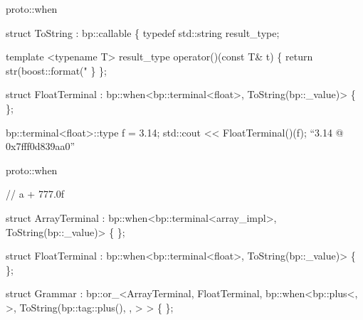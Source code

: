 
\begin{frame}[fragile]{proto::when}
\begin{semiverbatim}
struct ToString : bp::callable
\{
  typedef std::string result_type;
  
  template <typename T>
  result_type operator()(const T& t)
  \{
    return str(boost::format("%
  \}
\};

struct FloatTerminal
  : bp::when<bp::terminal<float>, ToString(bp::_value)>
\{ \};

bp::terminal<float>::type f = {3.14}; 
std::cout << FloatTerminal()(f);  
``3.14 @ 0x7fff0d839aa0''

\end{semiverbatim}
\note{ }
\end{frame}


\begin{frame}[fragile]{proto::when}
\begin{semiverbatim}
// \alert<1>{a + 777.0f}

struct \alert<3>{ArrayTerminal}
  : bp::when<\alert<2,8>{bp::terminal<\alert<9>{array_impl}>}, \alert<11>{ToString(bp::_value)}>
\{ \};

struct \alert<5>{FloatTerminal}
  : bp::when<\alert<4>{bp::terminal<float>}, ToString(bp::_value)>
\{ \};

struct Grammar : 
  bp::or_<ArrayTerminal,
          FloatTerminal,
          bp::when<\alert<6>{bp::plus<, 
                            >},
                   \alert<7>{ToString(\alert<14>{bp::tag::plus()},
                            ,
                            }>
	    >
\{ \};      
\end{semiverbatim}
\note{ }
\end{frame}


